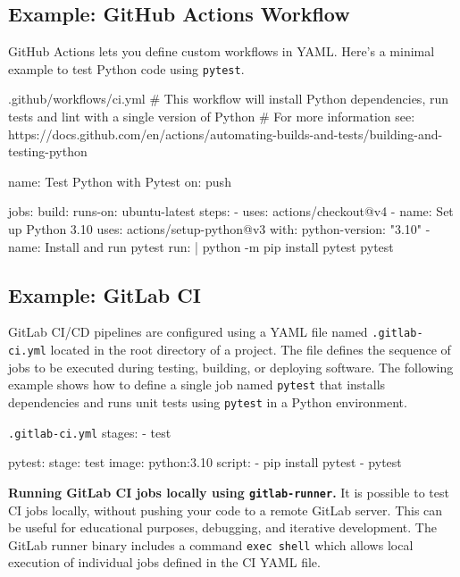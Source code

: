 \subsection{Example: GitHub Actions Workflow}
GitHub Actions lets you define custom workflows in YAML. Here's a minimal example to test Python code using \texttt{pytest}.

\begin{codeonly}{.github/workflows/ci.yml}
# This workflow will install Python dependencies, run tests and lint with a single version of Python
# For more information see: https://docs.github.com/en/actions/automating-builds-and-tests/building-and-testing-python

name: Test Python with Pytest
on: push

jobs:
  build:
    runs-on: ubuntu-latest
    steps:
    - uses: actions/checkout@v4
    - name: Set up Python 3.10
      uses: actions/setup-python@v3
      with:
        python-version: "3.10"
    - name: Install and run pytest
      run: |
        python -m pip install pytest
        pytest
\end{codeonly}

%
\subsection{Example: GitLab CI}

GitLab CI/CD pipelines are configured using a YAML file named {\tt .gitlab-ci.yml} located in the root directory of a project. The file defines the sequence of jobs to be executed during testing, building, or deploying software. The following example shows how to define a single job named {\tt pytest} that installs dependencies and runs unit tests using {\tt pytest} in a Python environment.

\begin{codeonly}{\texttt{.gitlab-ci.yml}}
stages:
  - test

pytest:
  stage: test
  image: python:3.10
  script:
    - pip install pytest
    - pytest
\end{codeonly}

{\bf Running GitLab CI jobs locally using {\tt gitlab-runner}.} It is possible to test CI jobs locally, without pushing your code to a remote GitLab server. This can be useful for educational purposes, debugging, and iterative development. The GitLab runner binary includes a command {\tt exec shell} which allows local execution of individual jobs defined in the CI YAML file.

